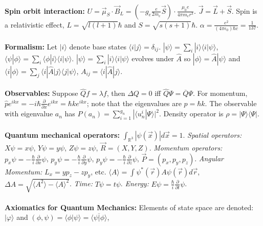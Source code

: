 \\
{\bf Spin orbit interaction:} $U= {\vec {\mu}}_S \cdot {\vec B}_L =
(-g_e {\frac {e} {2 m_e}} {\vec S}) \cdot {\frac {\mu_0 e} {4 \pi m_e r^3}}$.
${\vec J}= {\vec L} + {\vec S}$.  Spin is a relativistic effect,
$L= \sqrt{l(l+1)} \hbar$ and
$S= \sqrt{s(s+1)} \hbar$.  $\alpha = {\frac {e^2} {(4 \pi \epsilon_0) \hbar c}} = {\frac 1 {137}}$.
\\
\\
{\bf Formalism:}
Let $|i \rangle $ denote base states $ \langle i|j \rangle = \delta_{ij}$.
$|\psi \rangle  = \sum_i |i \rangle  \langle i | \psi \rangle $,
$\langle \psi | \phi \rangle  = \sum_i  \langle \phi|i \rangle   \langle i | \psi \rangle $.
$| \psi \rangle  = \sum_i |i \rangle   \langle i|\psi \rangle $ evolves under $\hat {A}$ so
$|\phi \rangle  = \hat{A} |\psi \rangle $ and $ \langle i | \phi \rangle  = \sum_j  \langle i| \hat{A} | j \rangle   \langle j| \psi \rangle $,
$A_{ij}=  \langle i | \hat {A} |j \rangle $.
\\
\\
{\bf Observables:}  
Suppose
${\hat Q} f = \lambda f$, then $\Delta Q= 0$ iff ${\hat Q} \Psi= {\overline Q} \Psi$.  For
momentum, 
${\hat p} e^{ikx} = - i \hbar {\frac {\partial} {\partial x}} e^{ikx}= \hbar k e^{ikx}$;
note that the eigenvalues are $p= \hbar k$.
The observable with eigenvalue $a_n$ has 
$P(a_n) = \sum_{i=1}^{g_n} | \langle u_n^i | \Psi \rangle|^2$.
Density operator is $\rho= | \Psi \rangle  \langle \Psi|$.
\\
\\
{\bf Quantum mechanical operators:}
$\int_{{\mathbb R}^3} |\psi({\vec x})| d{\vec x}= 1$.
\emph{Spatial operators:}
$X \psi= x \psi$,
$Y \psi= y \psi$,
$Z \psi= z \psi$, ${\vec R}= (X,Y,Z)$.
\emph{Momentum operators:}
$p_x \psi= -{\frac {\hbar} {i}} {\frac {\partial} {\partial x}} \psi$,
$p_y \psi= -{\frac {\hbar} {i}} {\frac {\partial} {\partial y}} \psi$,
$p_y \psi= -{\frac {\hbar} {i}} {\frac {\partial} {\partial z}} \psi$,
${\vec P}= (p_x, p_y, p_z)$.
\emph{Angular Momentum:} $L_x=yp_z-zp_y$, etc.
$ \langle A \rangle = \int \psi^*({\vec r}) A \psi({\vec r}) d {\vec r}$,
$\Delta A= {\sqrt { \langle A^2 \rangle - \langle A \rangle ^2}}$.
\emph{Time:} 
$T \psi = t \psi $.
\emph{Energy:}
$E \psi= {\frac {\hbar} {i}} {\frac {\partial} {\partial t}} \psi$.
\\
\\
{\bf Axiomatics for Quantum Mechanics:}
Elements of state space are denoted: $|\varphi \rangle $ and 
$(\phi, \psi)=  \langle \phi | \psi \rangle =
{\overline {\langle \psi | \phi \rangle }} $,
